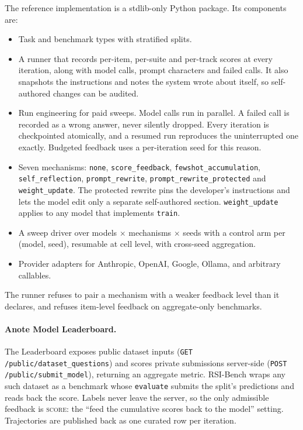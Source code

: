 \documentclass[11pt]{article}
\begin{document}
The reference implementation is a stdlib-only Python package. Its components are:
\begin{itemize}
  \item Task and benchmark types with stratified splits.
  \item A runner that records per-item, per-suite and per-track scores at every iteration, along with model calls, prompt characters and failed calls. It also snapshots the instructions and notes the system wrote about itself, so self-authored changes can be audited.
  \item Run engineering for paid sweeps. Model calls run in parallel. A failed call is recorded as a wrong answer, never silently dropped. Every iteration is checkpointed atomically, and a resumed run reproduces the uninterrupted one exactly. Budgeted feedback uses a per-iteration seed for this reason.
  \item Seven mechanisms: \texttt{none}, \texttt{score\_feedback}, \texttt{fewshot\_accumulation}, \texttt{self\_reflection}, \texttt{prompt\_rewrite}, \texttt{prompt\_rewrite\_protected} and \texttt{weight\_update}. The protected rewrite pins the developer's instructions and lets the model edit only a separate self-authored section. \texttt{weight\_update} applies to any model that implements \texttt{train}.
  \item A sweep driver over models $\times$ mechanisms $\times$ seeds with a control arm per (model, seed), resumable at cell level, with cross-seed aggregation.
  \item Provider adapters for Anthropic, OpenAI, Google, Ollama, and arbitrary callables.
\end{itemize}
The runner refuses to pair a mechanism with a weaker feedback level than it declares, and refuses item-level feedback on aggregate-only benchmarks.

\paragraph{Anote Model Leaderboard.} The Leaderboard exposes public dataset inputs (\texttt{GET /public/dataset\_questions}) and scores private submissions server-side (\texttt{POST /public/submit\_model}), returning an aggregate metric. RSI-Bench wraps any such dataset as a benchmark whose \texttt{evaluate} submits the split's predictions and reads back the score. Labels never leave the server, so the only admissible feedback is \textsc{score}: the ``feed the cumulative scores back to the model'' setting. Trajectories are published back as one curated row per iteration.
\end{document}
